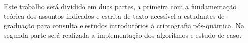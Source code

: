 Este trabalho será dividido em duas partes, a primeira com a fundamentação teórica dos assuntos indicados e escrita de texto acessível a estudantes de graduação para consulta e estudos introdutórios à criptografia pós-quântica. Na segunda parte será realizada a implementação dos algoritmos e estudo de caso.

